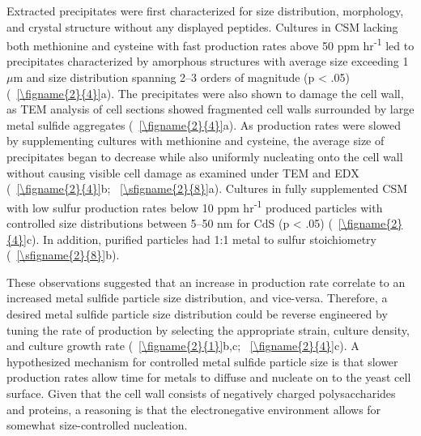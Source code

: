 \documentclass[../main/main]{subfiles}
\begin{document}
Extracted precipitates were first characterized for size distribution, morphology, and crystal structure without any displayed peptides. Cultures in CSM lacking both methionine and cysteine with fast \HS{} production rates above 50 ppm hr\textsuperscript{-1} led to precipitates characterized by amorphous structures with average size exceeding 1 $\mu$m and size distribution spanning 2--3 orders of magnitude (p < .05) (\FIGURE~\ref{\figname{2}{4}}a). The precipitates were also shown to damage the cell wall, as TEM analysis of cell sections showed fragmented cell walls surrounded by large metal sulfide aggregates (\FIGURE~\ref{\figname{2}{4}}a). As \HS{} production rates were slowed by supplementing cultures with methionine and cysteine, the average size of precipitates began to decrease while also uniformly nucleating onto the cell wall without causing visible cell damage as examined under TEM and EDX (\FIGURE~\ref{\figname{2}{4}}b; \sFIGURE~\ref{\sfigname{2}{8}}a).
Cultures in fully supplemented CSM with low sulfur production rates below 10 ppm hr\textsuperscript{-1} produced particles with controlled size distributions between 5--50 nm for CdS (p < .05) (\FIGURE~\ref{\figname{2}{4}}c). In addition, purified particles had 1:1 metal to sulfur stoichiometry (\sFIGURE~\ref{\sfigname{2}{8}}b).

These observations suggested that an increase in \HS{} production rate correlate to an increased metal sulfide particle size distribution, and vice-versa. Therefore, a desired metal sulfide particle size distribution could be reverse engineered by tuning the rate of \HS{} production by selecting the appropriate strain, culture density, and culture growth rate (\FIGURE~\ref{\figname{2}{1}}b,c; \FIGURE~\ref{\figname{2}{4}}c). A hypothesized mechanism for controlled metal sulfide particle size is that slower \HS{} production rates allow time for metals to diffuse and nucleate on to the yeast cell surface. Given that the cell wall consists of negatively charged polysaccharides and proteins, a reasoning is that the electronegative environment allows for somewhat size-controlled nucleation.
\end{document}
